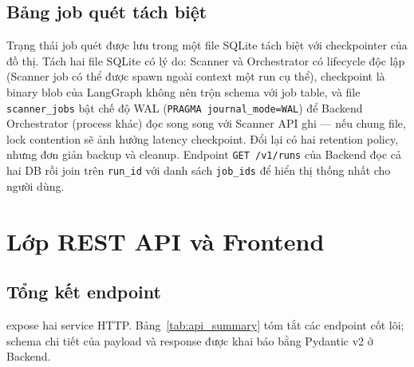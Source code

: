 \subsection{Bảng job quét tách biệt}

Trạng thái job quét được lưu trong một file SQLite tách biệt với checkpointer của đồ thị. Tách hai file SQLite có lý do: Scanner và Orchestrator có lifecycle độc lập (Scanner job có thể được spawn ngoài context một run cụ thể), checkpoint là binary blob của LangGraph không nên trộn schema với job table, và file \texttt{scanner\_jobs} bật chế độ WAL (\texttt{PRAGMA journal\_mode=WAL}) để Backend Orchestrator (process khác) đọc song song với Scanner API ghi — nếu chung file, lock contention sẽ ảnh hưởng latency checkpoint. Đổi lại có hai retention policy, nhưng đơn giản backup và cleanup. Endpoint \texttt{GET /v1/runs} của Backend đọc cả hai DB rồi join trên \texttt{run\_id} với danh sách \texttt{job\_ids} để hiển thị thống nhất cho người dùng.



\section{Lớp REST API và Frontend}
\label{sec:api_impl}

\subsection{Tổng kết endpoint}

\sysnameshort{} expose hai service HTTP. Bảng~\ref{tab:api_summary} tóm tắt các endpoint cốt lõi; schema chi tiết của payload và response được khai báo bằng Pydantic v2 ở Backend.

